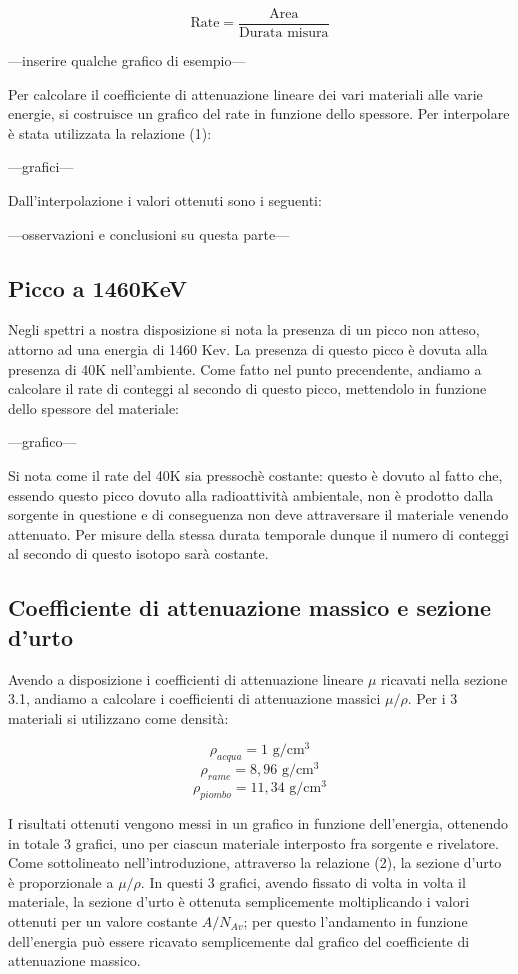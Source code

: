 \documentclass[a4paper,10pt]{article}
\newcommand*{\unit}[1]{\ensuremath{\mathrm{\,#1}}}
\begin{document}
\begin{equation}
	\textrm{Rate} = \frac{\textrm{Area}}{\textrm{Durata  misura}}
\end{equation}

---inserire qualche grafico di esempio---

Per calcolare il coefficiente di attenuazione lineare dei vari materiali alle varie energie, si costruisce un grafico del rate in funzione dello spessore. Per interpolare è stata utilizzata la relazione (1):

---grafici---

Dall'interpolazione i valori ottenuti sono i seguenti:

---osservazioni e conclusioni su questa parte---

\subsection{Picco a 1460KeV}

Negli spettri a nostra disposizione si nota la presenza di un picco non atteso, attorno ad una energia di 1460 Kev. La presenza di questo picco è dovuta alla presenza di 40K nell'ambiente. Come fatto nel punto precendente, andiamo a calcolare il rate di conteggi al secondo di questo picco, mettendolo in funzione dello spessore del materiale:

---grafico---

Si nota come il rate del 40K sia pressochè costante: questo è dovuto al fatto che, essendo questo picco dovuto alla radioattività ambientale, non è prodotto dalla sorgente in questione e di conseguenza non deve attraversare il materiale venendo attenuato. Per misure della stessa durata temporale dunque il numero di conteggi al secondo di questo isotopo sarà costante.

\subsection{Coefficiente di attenuazione massico e sezione d'urto}
Avendo a disposizione i coefficienti di attenuazione lineare $\mu$ ricavati nella sezione 3.1, andiamo a calcolare i coefficienti di attenuazione massici $\mu/\rho$. Per i 3 materiali si utilizzano come densità:

$$
	\rho_{acqua} = 1\, \unit{g/cm^3}
$$
$$
	\rho_{rame} = 8,96\, \unit{g/cm^3}
$$
$$
	\rho_{piombo} = 11,34\, \unit{g/cm^3}
$$

I risultati ottenuti vengono messi in un grafico in funzione dell'energia, ottenendo in totale 3 grafici, uno per ciascun materiale interposto fra sorgente e rivelatore. Come sottolineato nell'introduzione, attraverso la relazione (2), la sezione d'urto è proporzionale a $\mu/\rho$. In questi 3 grafici, avendo fissato di volta in volta il materiale, la sezione d'urto è ottenuta semplicemente moltiplicando i valori ottenuti per un valore costante $A/N_{Av}$; per questo l'andamento in funzione dell'energia può essere ricavato semplicemente dal grafico del coefficiente di attenuazione massico.
\end{document}

